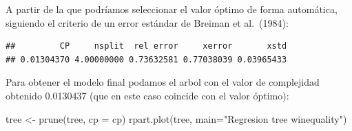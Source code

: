 \documentclass[
]{book}
\newenvironment{Shaded}{\begin{snugshade}}{\end{snugshade}}
\newcommand{\AttributeTok}[1]{\textcolor[rgb]{0.77,0.63,0.00}{#1}}
\newcommand{\CommentTok}[1]{\textcolor[rgb]{0.56,0.35,0.01}{\textit{#1}}}
\newcommand{\FunctionTok}[1]{\textcolor[rgb]{0.00,0.00,0.00}{#1}}
\newcommand{\NormalTok}[1]{#1}
\newcommand{\OtherTok}[1]{\textcolor[rgb]{0.56,0.35,0.01}{#1}}
\newcommand{\SpecialCharTok}[1]{\textcolor[rgb]{0.00,0.00,0.00}{#1}}
\newcommand{\StringTok}[1]{\textcolor[rgb]{0.31,0.60,0.02}{#1}}
\theoremstyle{break}
\theoremstyle{definition}
\theoremstyle{definition}
\theoremstyle{definition}
\theoremstyle{definition}
\theoremstyle{remark}
\begin{document}
A partir de la que podríamos seleccionar el valor óptimo de forma automática,
siguiendo el criterio de un error estándar de Breiman et al.~(1984):

\begin{Shaded}
\end{Shaded}

\begin{verbatim}
##         CP     nsplit  rel error     xerror       xstd 
## 0.01304370 4.00000000 0.73632581 0.77038039 0.03965433
\end{verbatim}

\begin{Shaded}
\end{Shaded}

Para obtener el modelo final podamos el arbol con el valor de complejidad obtenido 0.0130437 (que en este caso coincide con el valor óptimo):

\begin{Shaded}
\begin{Highlighting}[]
\NormalTok{tree }\OtherTok{\textless{}{-}} \FunctionTok{prune}\NormalTok{(tree, }\AttributeTok{cp =}\NormalTok{ cp)}
\FunctionTok{rpart.plot}\NormalTok{(tree, }\AttributeTok{main=}\StringTok{"Regresion tree winequality"}\NormalTok{) }
\end{Highlighting}
\end{Shaded}
\end{document}
